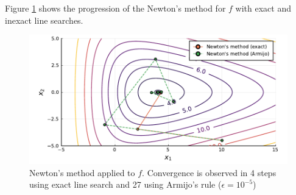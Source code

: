 Figure \ref{fig:newton} shows the progression of the Newton's method for $f$ with exact and inexact line searches.

\begin{figure}[H]
\includegraphics[width=\textwidth]{part_2/chapter_5/figures/newton.pdf}	
\caption{Newton's method applied to $f$. Convergence is observed in 4 steps using exact line search and 27 using Armijo's rule ($\epsilon = 10^{-5}$)} \label{fig:newton}
\end{figure}

